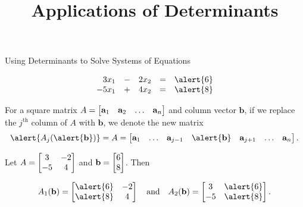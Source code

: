 \documentclass[xcolor=dvipsnames,aspectratio=169,t]{beamer}
\title{Applications of Determinants}
\begin{document}
\maketitle

\begin{frame}{Using Determinants to Solve Systems of Equations}

\[ \begin{array}{rcrcr}
3x_1 & - & 2x_2 & = & \alert{6}\\
-5x_1 & + & 4x_2 & = & \alert{8}\\
\end{array} \]

\bbox
For a square matrix $\displaystyle A = \begin{bmatrix} \mathbf{a}_1 &  \mathbf{a}_2  & \ldots &  \mathbf{a}_n \end{bmatrix}$ and column vector $\mathbf{b}$, \alert{if we replace the $j^{\mbox{th}}$ column of $A$ with $\mathbf{b}$}, we denote the new matrix
\[ \alert{A_j(\alert{ \mathbf{b}}) } =  A = \begin{bmatrix} \mathbf{a}_1 & \ldots & \mathbf{a}_{j-1} & \alert{\mathbf{b}} & \mathbf{a}_{j+1} & \ldots &   \mathbf{a}_n \end{bmatrix} .\]
\ebox

\pause
Let  $\displaystyle A = \begin{bmatrix} 3 & -2 \\ -5 & 4 \end{bmatrix}$ and \alert{$\displaystyle \mathbf{b} = \begin{bmatrix} 6\\ 8 \end{bmatrix}$}. Then

\[ A_1( \mathbf{b}) = \begin{bmatrix} \alert{6} & -2 \\ \alert{8} & 4 \end{bmatrix} \quad \mbox{and} \quad
A_2( \mathbf{b}) = \begin{bmatrix} 3 & \alert{6}  \\ -5 & \alert{8} \end{bmatrix} .\]

\end{frame}
\end{document}

